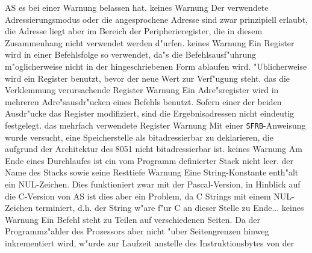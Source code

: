 \documentclass[12pt,a4paper,twoside]{report}
\newcommand{\tty}[1]{{\tt #1}}
\newcommand{\asname}{AS}
\begin{document}
\begin{description}
{                \asname{} es bei einer Warnung belassen hat.}
               {keines}
               {Warnung}
               {Der verwendete Adressierungsmodus oder die
                angesprochene Adresse sind zwar prinzipiell erlaubt, die
                Adresse liegt aber im Bereich der Peripherieregister, die in
                diesem Zusammenhang nicht verwendet werden d"urfen.}
               {keines}
               {Warnung}
               {Ein Register wird in einer Befehlsfolge so
                verwendet, da"s die Befehlsausf"uhrung m"oglicherweise nicht
                in der hingeschriebenen Form ablaufen wird.  "Ublicherweise
                wird ein Register benutzt, bevor der neue Wert zur Verf"ugung
                steht.}
               {das die Verklemmung verursachende Register}
               {Warnung}
               {Ein Adre"sregister wird in mehreren
                Adre"sausdr"ucken eines Befehls benutzt.  Sofern einer der
                beiden Ausdr"ucke das Register modifiziert, sind die
                Ergebnisadressen nicht eindeutig festgelegt.}
               {das mehrfach verwendete Register}
               {Warnung}
               {Mit einer \tty{SFRB}-Anweisung wurde
                versucht, eine Speicherstelle als bitadressierbar zu
                deklarieren, die aufgrund der Architektur des 8051 nicht
                bitadressierbar ist.}
               {keines}
               {Warnung}
               {Am Ende eines Durchlaufes ist ein vom
                Programm definierter Stack nicht leer.}
               {der Name des Stacks sowie seine Resttiefe}
	       {Warnung}
	       {Eine String-Konstante enth"alt ein
                NUL-Zeichen. Dies funktioniert zwar mit der Pascal-Version,
                in Hinblick auf die C-Version von \asname{} ist dies aber ein Problem,
                da C Strings mit einem NUL-Zeichen terminiert, d.h. der String
                w"are f"ur C an dieser Stelle zu Ende...}
	       {keines}
	       {Warnung}
	       {Ein Befehl steht zu Teilen auf
                verschiedenen Seiten.  Da der Programmz"ahler des Prozessors
                aber nicht "uber Seitengrenzen hinweg inkrementiert wird,
                w"urde zur Laufzeit anstelle des Instruktionsbytes von der
}
\end{description}
\end{document}
